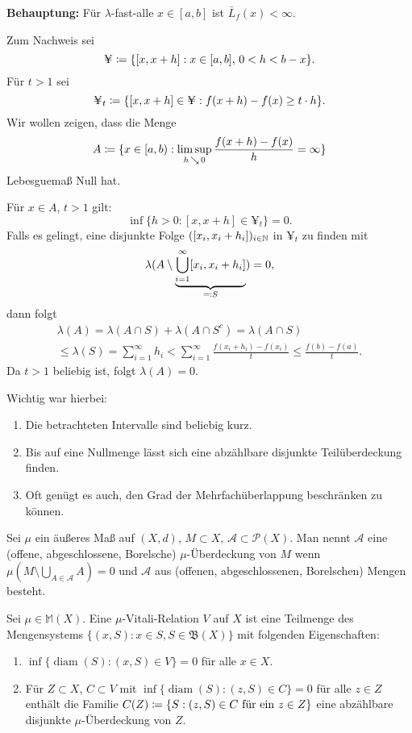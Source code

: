 \documentclass[a4paper,twoside,DIV15,BCOR12mm]{scrbook}
\newcommand{\A}{\mathcal A}
\newcommand{\borel}{\mathfrak B}
\DeclareMathOperator{\diam}{diam}
\DeclareMathOperator{\downto}{\searrow}
\begin{document}
\textbf{Behauptung:} Für $\lambda$-fast-alle $x\in[a,b]$ ist $\bar L_f(x)<\infty$.

Zum Nachweis sei
\[
\yen  \da \{[x,x+h]: x\in[a,b],\, 0<h<b-x\}.
\]
Für $t>1$ sei
\[
\yen_t \da \{[x,x+h] \in \yen: f(x+h) - f(x) \ge t\cdot h\}.
\]
Wir wollen zeigen, dass die Menge
\[
A\da \{x\in [a,b): \limsup_{h\downto0} \frac{f(x+h)-f(x)}h = \infty\}
\]
Lebesguemaß Null hat.

Für $x\in A$, $t>1$ gilt:
\[
\inf\{h>0: [x,x+h ] \in \yen_t\} = 0.
\]
Falls es gelingt, eine disjunkte Folge $([x_i, x_i+h_i])_{i\in\mathbb{N}}$ in $\yen_t$ zu finden mit
\[
\lambda( A \setminus  \underbrace{\bigcup_{i=1}^\infty [x_i, x_i+h_i]}_{\ad S}) = 0,
\]
dann folgt
\begin{multline*}
\lambda(A) = \lambda(A\cap S) + \lambda(A\cap S^c) = \lambda(A\cap S)\\
\le \lambda(S) = \sum_{i=1}^\infty h_i < \sum_{i=1}^\infty \frac{f(x_i+h_i)- f(x_i)}t \le \frac{f(b)-f(a)}t.
\end{multline*}
Da $t>1$ beliebig ist, folgt $\lambda(A) = 0$.

Wichtig war hierbei:
\begin{enumerate}
\item Die betrachteten Intervalle sind beliebig kurz.
\item Bis auf eine Nullmenge lässt sich eine abzählbare disjunkte Teilüberdeckung finden.
\item Oft genügt es auch, den Grad der Mehrfachüberlappung beschränken zu können.
\end{enumerate}

\begin{definition}
Sei $\mu$ ein äußeres Maß auf $(X,d)$, $M\subset X$, $\A\subset \mathcal P(X)$. Man nennt $\A$ eine (offene, abgeschlossene, Borelsche) $\mu$-Überdeckung von $M$ wenn $\mu(M\setminus \bigcup_{A\in\A} A) = 0$ und $\A$ aus (offenen, abgeschlossenen, Borelschen) Mengen besteht.
\end{definition}

\begin{definition}
Sei $\mu\in \mathbb M(X)$. Eine $\mu$-Vitali-Relation $V$ auf $X$ ist eine Teilmenge des Mengensystems $\{(x,S): x\in S, S\in \borel(X)\}$ mit folgenden Eigenschaften:
\begin{enumerate}
\item $\inf\{\diam(S): (x,S)\in V\}=0$ für alle $x\in X$.
\item Für $Z\subset X$, $C\subset V$ mit $\inf\{\diam(S): (z,S)\in C\}=0$ für alle $z\in Z$ enthält die Familie $C(Z) \da \{S: (z,S)\in C \text{ für ein $z\in Z$}\}$ eine abzählbare disjunkte $\mu$-Überdeckung von $Z$.
\end{enumerate}
\end{definition}
\end{document}
